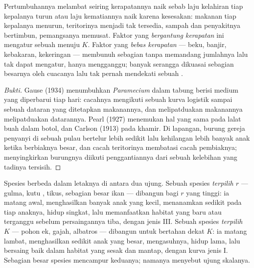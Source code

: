 \begin{proposition}\label{prop:b1:populations:densitydependence}
Pertumbuhannya melambat seiring kerapatannya naik sebab laju
kelahiran tiap kepalanya turun atau laju kematiannya naik karena
kesesakan: makanan tiap kepalanya menurun, teritorinya menjadi tak
tersedia, sampah dan penyakitnya bertimbun, pemangsanya memusat.
Faktor yang \emph{bergantung kerapatan} ini mengatur sebuah 
menuju $K$. Faktor yang \emph{bebas kerapatan} --- beku, banjir,
kebakaran, kekeringan --- membunuh sebagian tanpa memandang jumlahnya
lalu tak dapat mengatur, hanya mengganggu;  banyak serangga
dikuasai sebagian besarnya oleh cuacanya lalu tak pernah mendekati
sebuah .
\end{proposition}
\begin{proof}[Bukti]
Gause (1934) menumbuhkan \emph{Paramecium} dalam tabung berisi medium
yang diperbarui tiap hari: cacahnya mengikuti sebuah kurva logistik
sampai sebuah dataran yang ditetapkan makanannya, dan melipatduakan
makanannya melipatduakan datarannya. Pearl (1927) menemukan hal yang
sama pada lalat buah dalam botol, dan Carlson (1913) pada khamir. Di
lapangan, burung gereja penyanyi di sebuah pulau bertelur lebih
sedikit lalu kehilangan lebih banyak anak ketika  berbiaknya
besar, dan cacah teritorinya membatasi cacah pembiaknya; menyingkirkan
burungnya diikuti penggantiannya dari sebuah kelebihan yang tadinya
tersisih.
\end{proof}

\begin{definition}\label{def:b1:populations:rK}
Spesies berbeda dalam letaknya di antara dua ujung. Sebuah spesies
\emph{terpilih $r$} --- gulma, kutu , tikus, sebagian besar ikan
--- dibangun bagi $r$ yang tinggi: ia matang awal, menghasilkan banyak
anak yang kecil, menanamkan sedikit pada tiap anaknya, hidup singkat,
lalu memanfaatkan habitat yang baru atau terganggu sebelum
persaingannya tiba, dengan  jenis III. Sebuah spesies
\emph{terpilih $K$} --- pohon ek, gajah, albatros --- dibangun untuk
bertahan dekat $K$: ia matang lambat, menghasilkan sedikit anak yang
besar, mengasuhnya, hidup lama, lalu bersaing baik dalam habitat yang
sesak dan mantap, dengan kurva jenis I. Sebagian besar spesies
mencampur keduanya; namanya menyebut ujung skalanya.
\end{definition}

